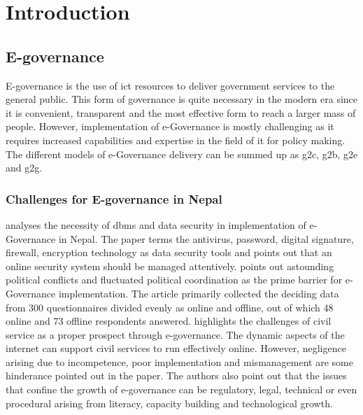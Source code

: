 \documentclass{home_assignment}
\newcommand\Myciteauthor[1]{\citeauthor{#1} \cite{#1}}
\begin{document}
    \clearpage
    \tableofcontents
    \clearpage
    \listoffigures
    \clearpage
    \printglossary[type=\acronymtype,title={List of Abbreviations}]
    \clearpage
    \section{Introduction}
    \subsection{E-governance}
    E-governance is the use of \acrfull{ict} resources to deliver government services to the general public. This form of governance is quite necessary in the modern era since it is convenient, transparent and the most effective form to reach a larger mass of people. However, implementation of e-Governance is mostly challenging as it requires increased capabilities and expertise in the field of \acrshort{it} for policy making. The different models of e-Governance delivery can be summed up as \acrfull{g2c}, \acrfull{g2b}, \acrfull{g2e} and \acrfull{g2g}.
    \subsubsection{Challenges for E-governance in Nepal}
    \Myciteauthor{giri-egov} analyses the necessity of \acrfull{dbms} and data security in implementation of e-Governance in Nepal. The paper terms the antivirus, password, digital signature, firewall, encryption technology as data security tools and points out that an online security system should be managed attentively. \Myciteauthor{buddhacarya-lbef} points out astounding political conflicts and fluctuated political coordination as the prime barrier for e-Governance implementation. The article primarily collected the deciding data from 300 questionnaires divided evenly as online and offline, out of which 48 online and 73 offline respondents answered. \Myciteauthor{giri-practicing} highlights the challenges of civil service as a proper prospect through e-governance. The dynamic aspects of the internet can support civil services to run effectively online. However, negligence arising due to incompetence, poor implementation and mismanagement are some hinderance pointed out in the paper. The authors also point out that the issues that confine the growth of e-governance can be regulatory, legal, technical or even procedural arising from literacy, capacity building and technological growth.
\end{document}
